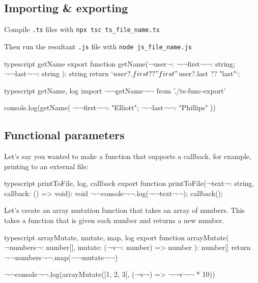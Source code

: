 \subsection{Importing \& exporting}

Compile \texttt{.ts} files with \texttt{npx tsc ts_file_name.ts}

Then run the resultant \texttt{.js} file with \texttt{node js_file_name.js}

\begin{monokai}{typescript}{
        getName
    }
    export function getName(¬user¬: { ¬¬first¬¬: string; ¬¬last¬¬: string }): string {
        return `${user?.first ?? "first"} ${user?.last ?? "last"}`;
    }
\end{monokai}

\begin{monokai}{typescript}{
        getName,
        log
    }
    import ¬¬getName¬¬ from './ts-func-export'
    
    console.log(getName({ ¬¬first¬¬: "Elliott"; ¬¬last¬¬: "Phillips" }))
\end{monokai}



\subsection{Functional parameters}

Let's say you wanted to make a function that supports a callback, for example, printing to an external file:

\begin{monokai}{typescript}{
        printToFile,
        log,
        callback
    }
    export function printToFile(¬text¬: string, callback: () => void): void {
        ¬¬console¬¬.log(¬¬text¬¬);
        callback();
    }
\end{monokai}

Let's create an array mutation function that takes an array of numbers. This takes a function that is given each number and returns a new number.

\begin{monokai}{typescript}{
        arrayMutate,
        mutate,
        map,
        log
    }
    export function arrayMutate(
        ¬numbers¬: number[],
        mutate: (¬v¬: number) => number
    ): number[] {
        return ¬¬numbers¬¬.map(¬¬mutate¬¬)
    }

    ¬¬console¬¬.log(arrayMutate([1, 2, 3], (¬v¬) => ¬¬v¬¬ * 10))
\end{monokai}

